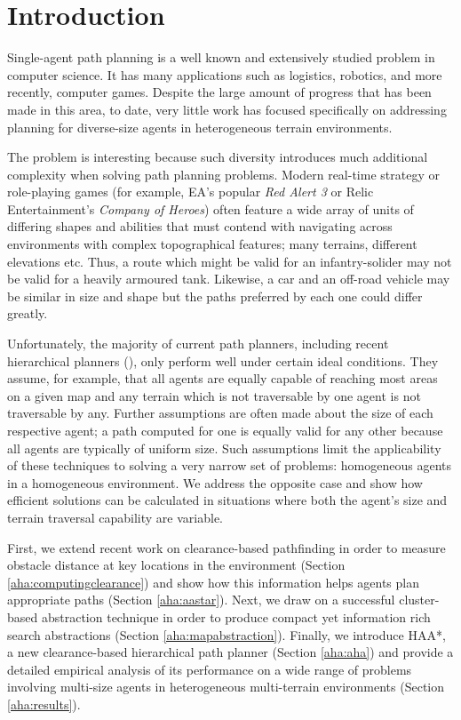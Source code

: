 \section{Introduction}
Single-agent path planning is a well known and extensively studied problem in computer science.
It has many applications such as logistics, robotics, and more recently, computer games. 
Despite the large amount of progress that has been made in this area, to date, very little work has focused specifically on addressing planning for diverse-size agents in heterogeneous terrain environments. 
\par \indent
The problem is interesting because such diversity introduces much additional complexity when solving path planning problems.
Modern real-time strategy or role-playing games (for example, EA's popular \emph{Red Alert 3} or Relic Entertainment's \emph{Company of Heroes}) often feature a wide array of units of differing shapes and abilities that must contend with navigating across environments with complex topographical features; many terrains, different elevations etc. 
Thus, a route which might be valid for an infantry-solider may not be valid for a heavily armoured tank. 
Likewise, a car and an off-road vehicle may be similar in size and shape but the paths preferred by each one could differ greatly. 
\par \indent
Unfortunately, the majority of current path planners, including recent hierarchical planners (\cite{botea04,sturtevant05,demyen07,geraerts07}), only perform well under certain ideal conditions. 
They assume, for example, that all agents are equally capable of reaching most areas on a given map and any terrain which is not traversable by one agent is not traversable by any. 
Further assumptions are often made about the size of each respective agent; a path computed for one is equally valid for any other because all agents are typically of uniform size. 
Such assumptions limit the applicability of these techniques to solving a very narrow set of problems: homogeneous agents in a homogeneous environment. 
We address the opposite case and show how efficient solutions can be calculated in situations where both the agent's size and terrain traversal capability are variable. 
\par \indent
First, we extend recent work on clearance-based pathfinding \cite{geraerts07} in order to measure obstacle distance at key locations in the environment (Section \ref{aha:computingclearance}) and show how this information helps agents plan appropriate paths (Section \ref{aha:aastar}). 
Next, we draw on a successful cluster-based abstraction technique \cite{botea04} in order to produce compact yet information rich search abstractions (Section \ref{aha:mapabstraction}). 
Finally, we introduce HAA*, a new clearance-based hierarchical path planner (Section \ref{aha:aha}) and provide a detailed empirical analysis of its performance on a wide range of problems involving multi-size agents in heterogeneous multi-terrain environments (Section \ref{aha:results}).
